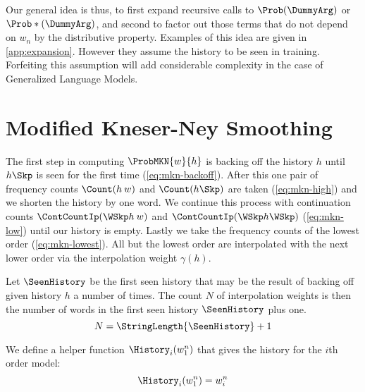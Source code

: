 Our general idea is thus, to first expand recursive calls to
$\Prob(\DummyArg)$ or $\Prob*(\DummyArg)$, and second to factor
out those terms that do not depend on $w_n$ by the distributive property.
Examples of this idea are given in \cref{app:expansion}.
However they assume the history to be seen in training.
Forfeiting this assumption will add considerable complexity in the case
of Generalized Language Models.

\section{Modified Kneser-Ney Smoothing}

The first step in computing $\ProbMKN{w}{h}$ is backing off the history $h$
until $h \Skp$ is seen for the first time (\cref{eq:mkn-backoff}).
After this one pair of frequency counts $\Count(h \: w)$ and $\Count(h \Skp)$
are taken (\cref{eq:mkn-high}) and we shorten the
history by one word.
We continue this process with continuation counts $\ContCountIp(\WSkp h \: w)$
and $\ContCountIp(\WSkp h \WSkp)$ (\cref{eq:mkn-low}) until our history is
empty.
Lastly we take the frequency counts of the lowest order
(\cref{eq:mkn-lowest}).
All but the lowest order are interpolated with the next lower order via the
interpolation weight $\gamma(h)$.

Let $\SeenHistory$ be the first seen history that may be the result of backing
off given history $h$ a number of times.
The count $N$ of interpolation weights is then the number of words in
the first seen history $\SeenHistory$ plus one.
\begin{equation}
  N = \StringLength{\SeenHistory} + 1
\end{equation}

We define a helper function $\History_i(w_1^n)$ that gives the history for the
$i$th order model:
\begin{equation}
  \History_i(w_1^n) = w_i^n
\end{equation}


